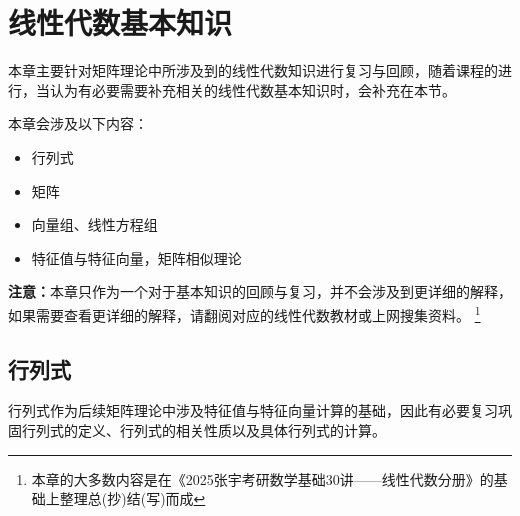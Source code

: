 \documentclass[12pt, a4paper, oneside, UTF8]{ctexbook}
\begin{document}

\else
\fi
\chapter{线性代数基本知识}
本章主要针对矩阵理论中所涉及到的线性代数知识进行复习与回顾，随着课程的进行，当认为有必要需要补充相关的线性代数基本知识时，会补充在本节。

本章会涉及以下内容：

\begin{itemize}[leftmargin=4em]
    \item 行列式
    \item 矩阵
    \item 向量组、线性方程组
    \item 特征值与特征向量，矩阵相似理论
\end{itemize}
\textbf{注意：}本章只作为一个对于基本知识的回顾与复习，并不会涉及到更详细的解释，如果需要查看更详细的解释，请翻阅对应的线性代数教材或上网搜集资料。
\footnote{本章的大多数内容是在《2025张宇考研数学基础30讲——线性代数分册》的基础上整理总(抄)结(写)而成}
\newpage
\section{行列式}

行列式作为后续矩阵理论中涉及特征值与特征向量计算的基础，因此有必要复习巩固行列式的定义、行列式的相关性质以及具体行列式的计算。
\end{document}
